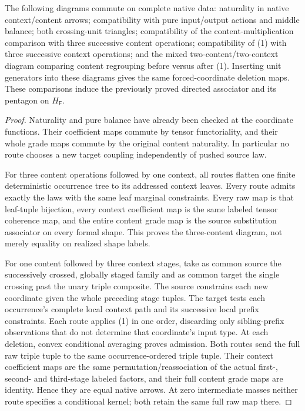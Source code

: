 \documentclass[11pt]{article}
\begin{document}
\begin{theorem}
The following diagrams commute on complete native data: naturality in native context/content arrows; compatibility with pure input/output actions and middle balance; both crossing-unit triangles; compatibility of the content-multiplication comparison with three successive content operations; compatibility of (1) with three successive context operations; and the mixed two-content/two-context diagram comparing content regrouping before versus after (1). Inserting unit generators into these diagrams gives the same forced-coordinate deletion maps. These comparisons induce the previously proved directed associator and its pentagon on $H_{\mathsf F}$.
\end{theorem}
\begin{proof}
Naturality and pure balance have already been checked at the coordinate functions. Their coefficient maps commute by tensor functoriality, and their whole grade maps commute by the original content naturality. In particular no route chooses a new target coupling independently of pushed source law.

For three content operations followed by one context, all routes flatten one finite deterministic occurrence tree to its addressed context leaves. Every route admits exactly the laws with the same leaf marginal constraints. Every raw map is that leaf-tuple bijection, every context coefficient map is the same labeled tensor coherence map, and the entire content grade map is the source substitution associator on every formal shape. This proves the three-content diagram, not merely equality on realized shape labels.

For one content followed by three context stages, take as common source the successively crossed, globally staged family and as common target the single crossing past the unary triple composite. The source constrains each new coordinate given the whole preceding stage tuples. The target tests each occurrence's complete local context path and its successive local prefix constraints. Each route applies (1) in one order, discarding only sibling-prefix observations that do not determine that coordinate's input type. At each deletion, convex conditional averaging proves admission. Both routes send the full raw triple tuple to the same occurrence-ordered triple tuple. Their context coefficient maps are the same permutation/reassociation of the actual first-, second- and third-stage labeled factors, and their full content grade maps are identity. Hence they are equal native arrows. At zero intermediate masses neither route specifies a conditional kernel; both retain the same full raw map there.


\end{proof}
\end{document}
